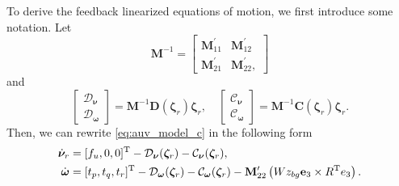 To derive the feedback linearized equations of motion, we first introduce some notation. Let
\begin{equation}
    \mathbf{M}^{-1} = \begin{bmatrix}
        \mathbf{M}_{11}^\prime & \mathbf{M}_{12}^\prime\\
        \mathbf{M}_{21}^\prime & \mathbf{M}_{22}^\prime,
    \end{bmatrix}
\end{equation}
and
\begin{equation}
    \begin{bmatrix}
    \mathcal{D}_{\bm{\nu}}\\
    \mathcal{D}_{\bm{\omega}}
    \end{bmatrix} = \mathbf{M}^{-1}\mathbf{D}(\bm{\zeta}_r) \bm{\zeta}_r, \quad \begin{bmatrix}
    \mathcal{C}_{\bm{\nu}}\\
    \mathcal{C}_{\bm{\omega}}
    \end{bmatrix} = \mathbf{M}^{-1}\mathbf{C}(\bm{\zeta}_r)\bm{\zeta}_r.
\end{equation}
Then, we can rewrite \eqref{eq:auv_model_c} in the following form
\begin{subequations}\label{eq:nu_omega_compact}
\begin{align}
    \dot{\bm{\nu}}_r &= [f_u,0,0]^{\rm T} - \mathcal{D}_{\bm{\nu}}(\bm{\zeta}_r) - \mathcal{C}_{\bm{\nu}}(\bm{\zeta}_r),\\
    \dot{\bm{\omega}} &= [t_p,t_q,t_r]^{\rm T} - \mathcal{D}_{\bm{\omega}}(\bm{\zeta}_r) - \mathcal{C}_{\bm{\omega}}(\bm{\zeta}_r) - \mathbf{M}_{22}^\prime\left(W z_{bg} \mathbf{e}_3 \times R^{\rm T} e_3\right).
\end{align}
\end{subequations}

